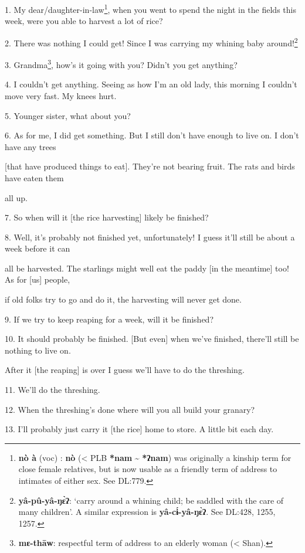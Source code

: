 \setcounter{footnote}{0}

1. My dear/daughter-in-law\footnote{\textbf{nò à} (voc) : \textbf{nò} (< PLB \textbf{*nam}  \~{} \textbf{ *ʔnam}) was originally a kinship term for close female relatives, but is now usable as a friendly term of address to intimates of either sex. See DL:779.}, when you went to spend the night in the fields this week, were
you able to harvest a lot of rice?

2. There was nothing I could get! Since I was carrying my whining baby around!\footnote{\textbf{yâ-pû-yâ-ŋɛ̀ʔ}: `carry around a whining child; be saddled with the care of many children'. A similar expression is \textbf{yâ-cɨ́-yâ-ŋɛ̀ʔ}. See DL:428, 1255, 1257.}

3. Grandma\footnote{\textbf{mɛ-thāw}: respectful term of address to an elderly woman (< Shan).}, how's it going with you? Didn't you get anything?

4. I couldn't get anything. Seeing as how I'm an old lady, this morning I couldn't
move very fast. My knees hurt.

5. Younger sister, what about you?

6. As for me, I did get something. But I still don't have enough to live on. I
don't have any trees

[that have produced things to eat]. They're not bearing fruit. The rats and birds
have eaten them

all up.

7. So when will it [the rice harvesting] likely be finished?

8. Well, it's probably not finished yet, unfortunately! I guess it'll still be
about a week before it can

all be harvested. The starlings might well eat the paddy [in the meantime] too!
As for [us] people,

if old folks try to go and do it, the harvesting will never get done.

9. If we try to keep reaping for a week, will it be finished?

10. It should probably be finished. [But even] when we've finished, there'll still
be nothing to live on.

After it [the reaping] is over I guess we'll have to do the threshing.

11. We'll do the threshing.

12. When the threshing's done where will you all build your granary?

13. I'll probably just carry it [the rice] home to store. A little bit each day.

